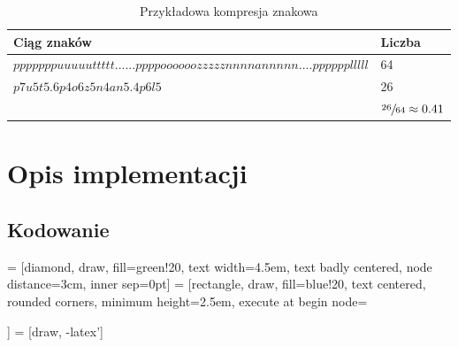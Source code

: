 \documentclass[12pt,a4paper,notitlepage]{report}
\begin{document}
\begin{table}[H]
\begin{tabular}{l l}
Ciąg znaków & Liczba \\\hline
$pppppppuuuuuttttt......ppppoooooozzzzznnnnannnnn....pppppplllll$& 64\\
$p7u5t5.6p4o6z5n4an5.4p6l5$& 26 \\ \hline
& $\sfrac{26}{64}\approx 0.41$
\end{tabular}
\caption{Przykładowa kompresja znakowa}
\end{table}

\section{Opis implementacji}
\subsection{Kodowanie}
 = [diamond, draw, fill=green!20, text width=4.5em, text badly centered, node distance=3cm, inner sep=0pt]
 = [rectangle, draw, fill=blue!20, text centered, rounded corners, minimum height=2.5em, execute at begin node={\begin{varwidth}{15em}}, execute at end node={\end{varwidth}}]
 = [draw, -latex']
\end{document}
